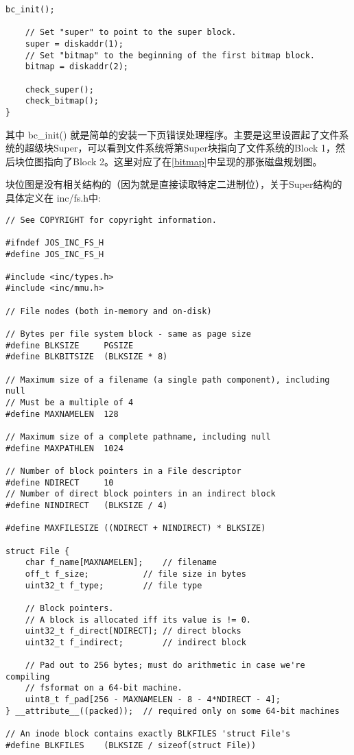 \documentclass{article}
\newcommand{\funcname}[1]{{\ttfamily \small #1}}
\begin{document}
\begin{CJK*}{UTF8}{gkai}
\begin{lstlisting}[style=ccode, title={\scriptsize \ttfamily \bfseries fs/fs.c: fs\_init()}]
	bc_init();

	// Set "super" to point to the super block.
	super = diskaddr(1);
	// Set "bitmap" to the beginning of the first bitmap block.
	bitmap = diskaddr(2);

	check_super();
	check_bitmap();
}
\end{lstlisting}

其中 \funcname{bc\_init()} 就是简单的安装一下页错误处理程序。主要是这里设置起了文件系统的超级块Super，可以看到文件系统将第Super块指向了文件系统的Block 1，然后块位图指向了Block 2。这里对应了在\ref{bitmap}中呈现的那张磁盘规划图。

块位图是没有相关结构的（因为就是直接读取特定二进制位），关于Super结构的具体定义在 inc/fs.h中:


\begin{lstlisting}[style=ccode, title={\scriptsize \ttfamily \bfseries inc/fs.h}]
// See COPYRIGHT for copyright information.

#ifndef JOS_INC_FS_H
#define JOS_INC_FS_H

#include <inc/types.h>
#include <inc/mmu.h>

// File nodes (both in-memory and on-disk)

// Bytes per file system block - same as page size
#define BLKSIZE		PGSIZE
#define BLKBITSIZE	(BLKSIZE * 8)

// Maximum size of a filename (a single path component), including null
// Must be a multiple of 4
#define MAXNAMELEN	128

// Maximum size of a complete pathname, including null
#define MAXPATHLEN	1024

// Number of block pointers in a File descriptor
#define NDIRECT		10
// Number of direct block pointers in an indirect block
#define NINDIRECT	(BLKSIZE / 4)

#define MAXFILESIZE	((NDIRECT + NINDIRECT) * BLKSIZE)

struct File {
	char f_name[MAXNAMELEN];	// filename
	off_t f_size;			// file size in bytes
	uint32_t f_type;		// file type

	// Block pointers.
	// A block is allocated iff its value is != 0.
	uint32_t f_direct[NDIRECT];	// direct blocks
	uint32_t f_indirect;		// indirect block

	// Pad out to 256 bytes; must do arithmetic in case we're compiling
	// fsformat on a 64-bit machine.
	uint8_t f_pad[256 - MAXNAMELEN - 8 - 4*NDIRECT - 4];
} __attribute__((packed));	// required only on some 64-bit machines

// An inode block contains exactly BLKFILES 'struct File's
#define BLKFILES	(BLKSIZE / sizeof(struct File))


\end{lstlisting}
\end{CJK*}
\end{document}
